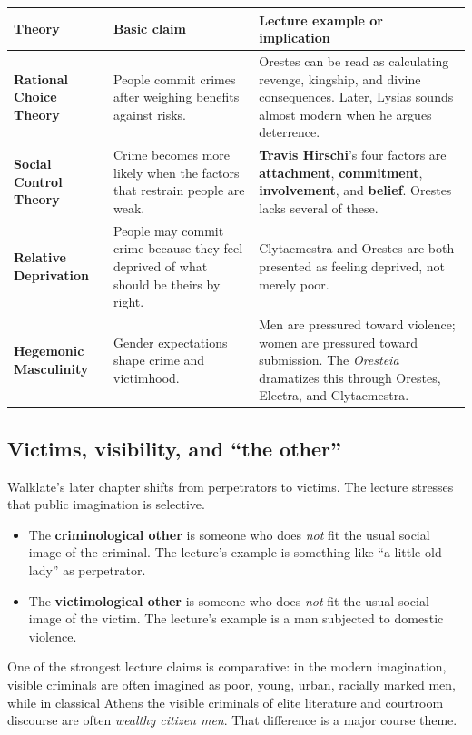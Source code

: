\documentclass[11pt]{article}
\newcommand{\keyterm}[1]{\textbf{#1}}
\begin{document}
\begin{tabularx}{\linewidth}{@{}lXX@{}}
\toprule
\textbf{Theory} & \textbf{Basic claim} & \textbf{Lecture example or implication} \\
\midrule
\textbf{Rational Choice Theory} & People commit crimes after weighing benefits against risks. & Orestes can be read as calculating revenge, kingship, and divine consequences. Later, Lysias sounds almost modern when he argues deterrence. \\
\textbf{Social Control Theory} & Crime becomes more likely when the factors that restrain people are weak. & \keyterm{Travis Hirschi}'s four factors are \textbf{attachment}, \textbf{commitment}, \textbf{involvement}, and \textbf{belief}. Orestes lacks several of these. \\
\textbf{Relative Deprivation} & People may commit crime because they feel deprived of what should be theirs by right. & Clytaemestra and Orestes are both presented as feeling deprived, not merely poor. \\
\textbf{Hegemonic Masculinity} & Gender expectations shape crime and victimhood. & Men are pressured toward violence; women are pressured toward submission. The \textit{Oresteia} dramatizes this through Orestes, Electra, and Clytaemestra. \\
\bottomrule
\end{tabularx}

\subsection*{Victims, visibility, and ``the other''}
Walklate's later chapter shifts from perpetrators to victims. The lecture stresses that public imagination is selective.

\begin{itemize}
\item The \keyterm{criminological other} is someone who does \emph{not} fit the usual social image of the criminal. The lecture's example is something like ``a little old lady'' as perpetrator.
\item The \keyterm{victimological other} is someone who does \emph{not} fit the usual social image of the victim. The lecture's example is a man subjected to domestic violence.
\end{itemize}

One of the strongest lecture claims is comparative: in the modern imagination, visible criminals are often imagined as poor, young, urban, racially marked men, while in classical Athens the visible criminals of elite literature and courtroom discourse are often \emph{wealthy citizen men}. That difference is a major course theme.
\end{document}
